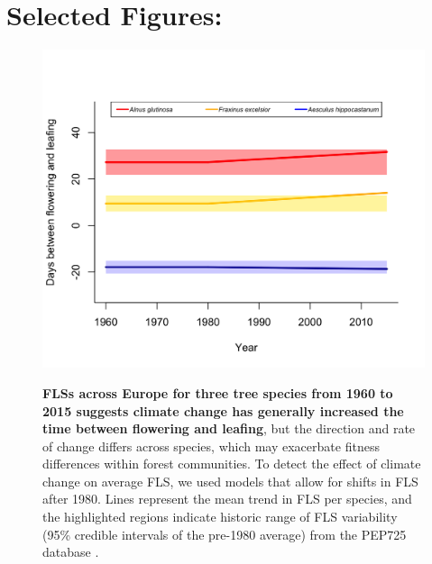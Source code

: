 \documentclass[11pt,a4paper]{article}
\begin{document}
\section*{Selected Figures:}
   \begin{figure}[ht!]
   \centering
 \includegraphics[width=.9\textwidth]{..//figure/FLS_climate_change.png}\\
\caption{\textbf{FLSs across Europe for three tree species from 1960 to 2015 suggests climate change has generally increased the time between flowering and leafing}, but the direction and rate of change differs across species, which may exacerbate fitness differences within forest communities. To detect the effect of climate change on average FLS, we used models that allow for shifts in FLS after 1980. Lines represent the mean trend in FLS per species, and the highlighted regions indicate historic range of FLS variability (95\% credible intervals of the pre-1980 average) from the PEP725 database \citep{PEP725}.}
    \label{fig:Figure 1}
    \end{figure}
\newpage

\end{document}
